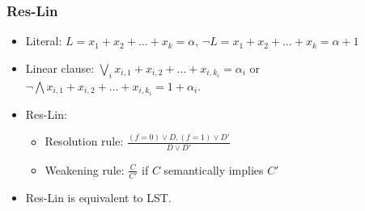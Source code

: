 \begin{frame}
    \frametitle{Res-Lin}

    \begin{itemize}
		\item Literal: $L = x_{1} + x_{2} + \dots + x_{k} = \alpha$,
    		$\lnot L = x_{1} + x_{2} + \dots + x_{k} = \alpha + 1$
		\item Linear clause: $\bigvee_i x_{i, 1} + x_{i, 2} + \dots + x_{i, k_i} =
		    \alpha_i$ or $\lnot \bigwedge x_{i, 1} + x_{i, 2} + \dots + x_{i, k_i} =
            1 + \alpha_i$.
        \pause
		\item Res-Lin:
			\begin{itemize}
				\item Resolution rule: $\frac{(f = 0) \lor D, (f = 1) \lor D'}
            		{D \lor D'}$ 
				\item Weakening rule: $\frac{C}{C'}$ if $C$ semantically implies $C'$
			\end{itemize}
		\item {} Res-Lin is equivalent to LST.
	\end{itemize}
\end{frame}



